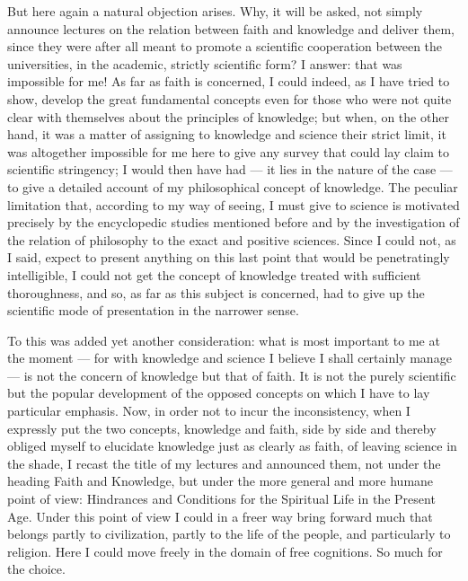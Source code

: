 \documentclass[12pt]{book}
\newcommand{\opage}[1]{\marginnote{\footnotesize\textit{[#1]}}}
\begin{document}
But here again a natural objection arises. Why, it will be asked, not
simply announce lectures on the relation between faith and knowledge and
deliver them, since they were after all meant to promote a scientific
cooperation between the universities, in the
\opage{282}\setcounter{footnote}{0}%
academic, strictly scientific form? I answer: that was impossible for me!
As far as faith is concerned, I could indeed, as I have tried to show,
develop the great fundamental concepts even for those who were not quite
clear with themselves about the principles of knowledge; but when, on the
other hand, it was a matter of assigning to knowledge and science their
strict limit, it was altogether impossible for me here to give any survey
that could lay claim to scientific stringency; I would then have had
--- it lies in the nature of the case --- to give a detailed account of my
philosophical concept of knowledge. The peculiar limitation that,
according to my way of seeing, I must give to science is motivated
precisely by the encyclopedic studies mentioned before and by the
investigation of the relation of philosophy to the exact and positive
sciences. Since I could not, as I said, expect to present anything on this
last point that would be penetratingly intelligible, I could not get the
concept of knowledge treated with sufficient thoroughness, and so, as far
as this subject is concerned, had to give up the scientific mode of
presentation in the narrower sense.

To this was added yet another consideration: what is most important to me
at the moment --- for with knowledge and science I believe I shall
certainly manage --- is not the concern of knowledge but that of faith. It
is not the purely scientific but the popular development of the opposed
concepts on which I have to lay particular emphasis. Now, in order not to
incur the inconsistency, when I expressly put the two concepts, knowledge
and faith, side by side and thereby obliged myself to elucidate knowledge
just as clearly as faith, of leaving science in the shade, I recast the
title of my lectures and announced them, not under the heading Faith and
Knowledge, but under the more general and more humane point of view:
Hindrances and Conditions for the Spiritual Life in the Present
\opage{283}\setcounter{footnote}{0}%
Age. Under this point of view I could in a freer way bring forward much
that belongs partly to civilization, partly to the life of the people, and
particularly to religion. Here I could move freely in the domain of free
cognitions. So much for the choice.
\end{document}
